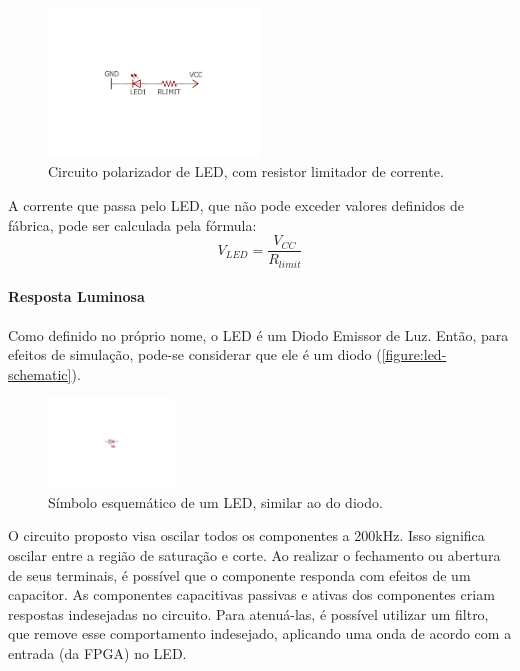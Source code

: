 	\begin{figure}[htb]
		\caption{\label{figure:led-circuit}Circuito polarizador de LED, com resistor limitador de corrente.}
		\centering
		\includegraphics[width=0.5\textwidth, trim={8cm 8cm 8cm 8.5cm},clip]{circuits/led_circuit.pdf}
	\end{figure}

	A corrente que passa pelo LED, que não pode exceder valores definidos de fábrica, pode ser calculada pela fórmula:
	\begin{equation}
	V_{LED} = \frac{V_{CC}}{R_{limit}}
	\end{equation}

	\paragraph*{Resposta Luminosa}

	Como definido no próprio nome, o LED é um Diodo Emissor de Luz. Então, para efeitos de simulação, pode-se considerar que ele é um diodo (\autoref{figure:led-schematic}).

	\begin{figure}[h]
		\caption{\label{figure:led-schematic}Símbolo esquemático de um LED, similar ao do diodo.}
		\centering
		\includegraphics[width=0.3\textwidth, trim={12cm 9.2cm 12cm 9.5cm},clip]{circuits/led_schematics.pdf}
	\end{figure}

	O circuito proposto visa oscilar todos os componentes a 200kHz. Isso significa oscilar entre a região de saturação e corte. Ao realizar o fechamento ou abertura de seus terminais, é possível que o componente responda com efeitos de um capacitor. As componentes capacitivas passivas e ativas dos componentes criam respostas indesejadas no circuito. Para atenuá-las, é possível utilizar um filtro, que remove esse comportamento indesejado, aplicando uma onda de acordo com a entrada (da FPGA) no LED.

